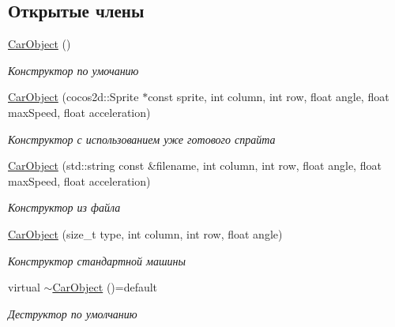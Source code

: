 \subsection*{Открытые члены}
\begin{DoxyCompactItemize}
\item 
\mbox{\label{classrtm_1_1_car_object_a7cc3a1d53d77c6b68e9b915455d41532}} 
\hyperlink{classrtm_1_1_car_object_a7cc3a1d53d77c6b68e9b915455d41532}{Car\+Object} ()
\begin{DoxyCompactList}\small\item\em Конструктор по умочанию \end{DoxyCompactList}\item 
\hyperlink{classrtm_1_1_car_object_af260c7e577da1e4dd75d11ae73deb1e2}{Car\+Object} (cocos2d\+::\+Sprite $\ast$const sprite, int column, int row, float angle, float max\+Speed, float acceleration)
\begin{DoxyCompactList}\small\item\em Конструктор с использованием уже готового спрайта \end{DoxyCompactList}\item 
\hyperlink{classrtm_1_1_car_object_a1f376fdc4f75df46cefc98051b05be4b}{Car\+Object} (std\+::string const \&filename, int column, int row, float angle, float max\+Speed, float acceleration)
\begin{DoxyCompactList}\small\item\em Конструктор из файла \end{DoxyCompactList}\item 
\hyperlink{classrtm_1_1_car_object_a9f40742f9e1deb7746c9207205be73b4}{Car\+Object} (size\+\_\+t type, int column, int row, float angle)
\begin{DoxyCompactList}\small\item\em Конструктор стандартной машины \end{DoxyCompactList}\item 
\mbox{\label{classrtm_1_1_car_object_a6af110bb8064a0b32ffe97a72e3645cf}} 
virtual \hyperlink{classrtm_1_1_car_object_a6af110bb8064a0b32ffe97a72e3645cf}{$\sim$\+Car\+Object} ()=default
\begin{DoxyCompactList}\small\item\em Деструктор по умолчанию \end{DoxyCompactList}\end{DoxyCompactItemize}
